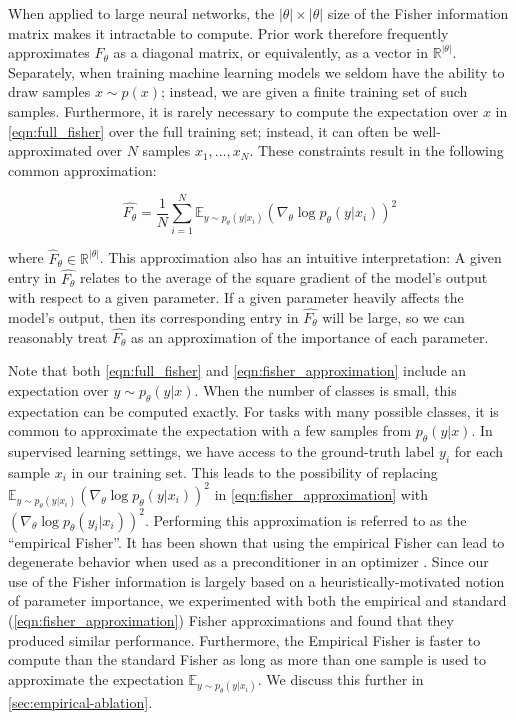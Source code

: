 When applied to large neural networks, the $|\theta| \times |\theta|$ size of the Fisher information matrix makes it intractable to compute. Prior work therefore frequently approximates $F_\theta$ as a diagonal matrix, or equivalently, as a vector in $\mathbb{R}^{|\theta|}$.
Separately, when training machine learning models we seldom have the ability to draw samples $x \sim p(x)$; instead, we are given a finite training set of such samples. Furthermore, it is rarely necessary to compute the expectation over $x$ in \ref{eqn:full_fisher} over the full training set; instead, it can often be well-approximated over $N$ samples $x_1, \ldots, x_N$. These constraints result in the following common approximation:

\begin{equation}
    \hat{F_{\theta}} = \frac{1}{N} \sum_{i = 1}^{N} \mathbb{E}_{y \sim p_{\theta}(y|x_i)}(\nabla_{\theta} \log p_{\theta}(y|x_i))^2
    \label{eqn:fisher_approximation}
\end{equation}

where $\hat{F}_{\theta} \in \mathbb{R}^{|\theta|}$.
This approximation also has an intuitive interpretation: A given entry in $\hat{F_{\theta}}$ relates to the average of the square gradient of the model's output with respect to a given parameter. If a given parameter heavily affects the model's output, then its corresponding entry in $\hat{F_{\theta}}$ will be large, so we can reasonably treat $\hat{F_{\theta}}$ as an approximation of the importance of each parameter.

Note that both \ref{eqn:full_fisher} and \ref{eqn:fisher_approximation} include an expectation over $y \sim p_\theta(y | x)$. When the number of classes is small, this expectation can be computed exactly. For tasks with many possible classes, it is common to approximate the expectation with a few samples from $p_\theta(y | x)$. In supervised learning settings, we have access to the ground-truth label $y_i$ for each sample $x_i$ in our training set. This leads to the possibility of replacing $\mathbb{E}_{y \sim p_{\theta}(y|x_i)}(\nabla_{\theta} \log p_{\theta}(y|x_i))^2$ in \ref{eqn:fisher_approximation} with $(\nabla_{\theta} \log p_{\theta}(y_i|x_i))^2$.
Performing this approximation is referred to as the ``empirical Fisher''. It has been shown that using the empirical Fisher can lead to degenerate behavior when used as a preconditioner in an optimizer \cite{martens2014new,kunstner2019limitations}. Since our use of the Fisher information is largely based on a heuristically-motivated notion of parameter importance, we experimented with both the empirical and standard (\ref{eqn:fisher_approximation}) Fisher approximations and found that they produced similar performance. Furthermore, the Empirical Fisher is faster to compute than the standard Fisher as long as more than one sample is used to approximate the expectation $\mathbb{E}_{y \sim p_{\theta}(y|x_i)}$.
We discuss this further in \ref{sec:empirical-ablation}.

